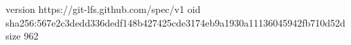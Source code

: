 version https://git-lfs.github.com/spec/v1
oid sha256:567e2c3dedd336dedf148b427425cde3174eb9a1930a11136045942fb710d52d
size 962
